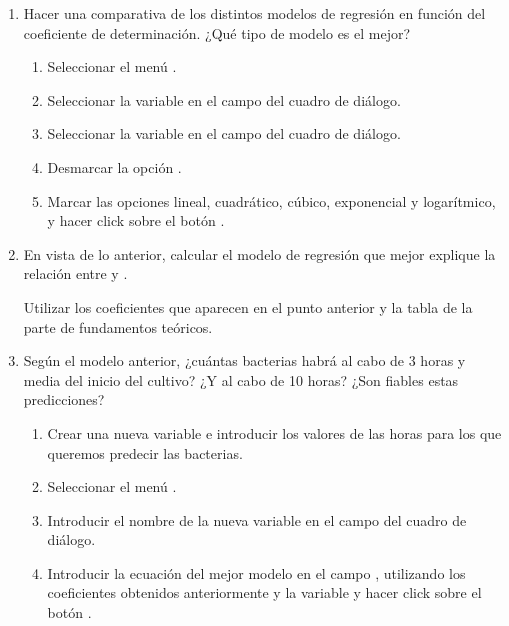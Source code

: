 \begin{enumerate}[leftmargin=*]
\begin{enumerate}
\item Hacer una comparativa de los distintos modelos de regresión en función del coeficiente de determinación. ¿Qué
tipo de modelo es el mejor?
\begin{indicacion}
\begin{enumerate}
\item Seleccionar el menú .
\item Seleccionar la variable  en el campo  del cuadro de diálogo.
\item Seleccionar la variable  en el campo   del cuadro de diálogo.
\item Desmarcar la opción .
\item Marcar las opciones lineal, cuadrático, cúbico, exponencial y logarítmico, y hacer click sobre el botón .
\end{enumerate}
\end{indicacion}
\item En  vista de lo anterior, calcular el modelo de regresión que 
mejor explique la relación entre  y .
\begin{indicacion}Utilizar los coeficientes que aparecen en el punto 
anterior y la tabla de la parte de fundamentos teóricos.
\end{indicacion}

\item Según el modelo anterior, ¿cuántas bacterias habrá al cabo de 3 
horas y media del inicio del cultivo? ¿Y al cabo
de 10 horas? ¿Son fiables estas predicciones?
\begin{indicacion}
\begin{enumerate}
\item Crear una nueva variable  e introducir 
los valores de las horas para los que queremos predecir las bacterias.
\item Seleccionar el menú .
\item Introducir el nombre de la nueva variable 
 en el campo 
del cuadro de diálogo.
\item Introducir la ecuación del mejor modelo en el campo 
, utilizando los coeficientes obtenidos 
anteriormente y la variable  y hacer click sobre 
el botón .
\end{enumerate}
\end{indicacion}


\end{enumerate}
\end{enumerate}
